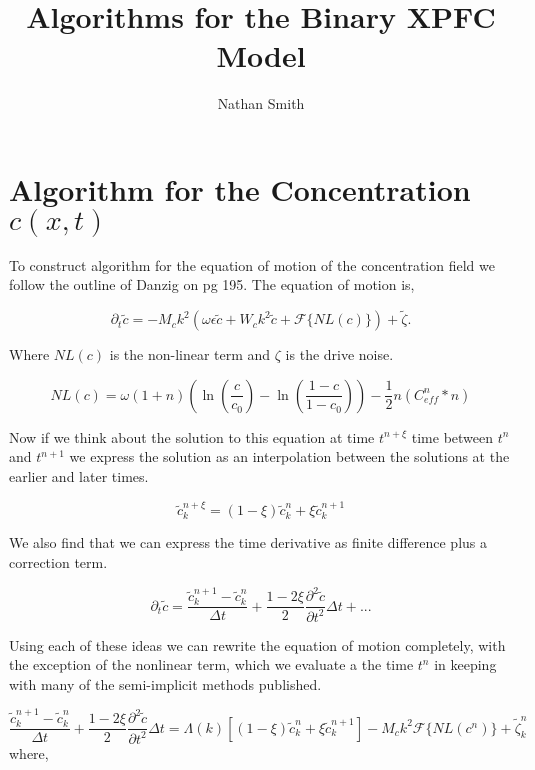 \documentclass[11pt]{article}
\title{Algorithms for the Binary XPFC Model}
\author{Nathan Smith}
\begin{document}
\maketitle

\section{Algorithm for the Concentration $c(x,t)$}

To construct algorithm for the equation of motion of the concentration field we follow the outline of Danzig on pg 195. The equation of motion is, 

\begin{equation}
\partial_t \tilde{c} = -M_c k^2\left(\omega\epsilon\tilde{c} + W_c k^2\tilde{c} + \mathcal{F}\lbrace NL(c) \rbrace\right) + \tilde{\zeta}.
\end{equation}

Where $NL(c)$ is the non-linear term and $\zeta$ is the drive noise. 

\begin{equation}
NL(c) = \omega(1+n)\left(\ln\left(\frac{c}{c_0}\right) - \ln\left(\frac{1-c}{1-c_0}\right)\right) - \frac{1}{2} n \left(C_{eff}^n\ast n\right)
\end{equation}

Now if we think about the solution to this equation at time $t^{n+\xi}$ time between $t^n$ and $t^{n+1}$ we express the solution as an interpolation between the solutions at the earlier and later times.

\begin{equation}
\tilde{c}_k^{n + \xi} = (1-\xi)\tilde{c}_k^n + \xi\tilde{c}_k^{n+1}
\end{equation}

We also find that we can express the time derivative as finite difference plus a correction term. 

\begin{equation}
\partial_t \tilde{c} = \frac{\tilde{c}_k^{n+1} - \tilde{c}_k^{n}}{\Delta t} + 
\frac{1 - 2\xi}{2} \frac{\partial^2 \tilde{c}}{\partial t^2}\Delta t + ...
\end{equation}

Using each of these ideas we can rewrite the equation of motion completely, with the exception of the nonlinear term, which we evaluate a the time $t^n$ in keeping with many of the semi-implicit methods published.

\begin{equation}
\frac{\tilde{c}_k^{n+1} - \tilde{c}_k^{n}}{\Delta t} + 
\frac{1 - 2\xi}{2} \frac{\partial^2 \tilde{c}}{\partial t^2}\Delta t = 
\Lambda(k)\left[(1-\xi)\tilde{c}_k^n + \xi\tilde{c}_k^{n+1}\right] - M_c k^2 \mathcal{F}\lbrace NL(c^n)\rbrace + \tilde{\zeta}_k^n
\end{equation}
where, 
\end{document}
